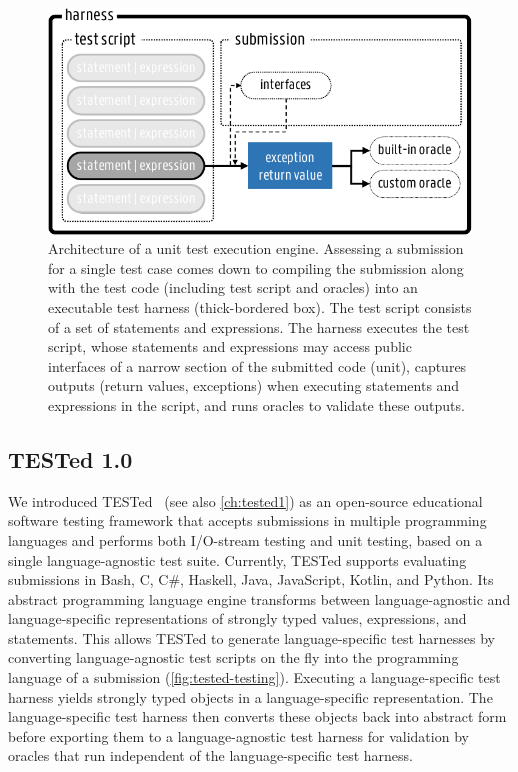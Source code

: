 \documentclass[../main]{subfiles}
\begin{document}
\begin{figure}
    \centering
    \includegraphics[width=\textwidth]{unit-testing}
    \caption{Architecture of a unit test execution engine. Assessing a submission for a single test case comes down to compiling the submission along with the test code (including test script and oracles) into an executable test harness (thick-bordered box). The test script consists of a set of statements and expressions. The harness executes the test script, whose statements and expressions may access public interfaces of a narrow section of the submitted code (unit), captures \textcolor{output-blue}{outputs} (return values, exceptions) when executing statements and expressions in the script, and runs oracles to validate these outputs.\label{fig:unit-testing}}
\end{figure}

\subsection{TESTed 1.0}\label{subsec:tested-1.0}

We introduced TESTed~\autocite{strijbolTESTedEducationalTesting2023} (see also \vref{ch:tested1}) as an open-source educational software testing framework that accepts submissions in multiple programming languages and performs both I/O-stream testing and unit testing, based on a single language-agnostic test suite.
Currently, TESTed supports evaluating submissions in Bash, C, C\#, Haskell, Java, JavaScript, Kotlin, and Python.
Its abstract programming language engine transforms between language-agnostic and language-specific representations of strongly typed values, expressions, and statements.
This allows TESTed to generate language-specific test harnesses by converting language-agnostic test scripts on the fly into the programming language of a submission (\vref{fig:tested-testing}).
Executing a language-specific test harness yields strongly typed objects in a language-specific representation.
The language-specific test harness then converts these objects back into abstract form before exporting them to a language-agnostic test harness for validation by oracles that run independent of the language-specific test harness.
\end{document}
